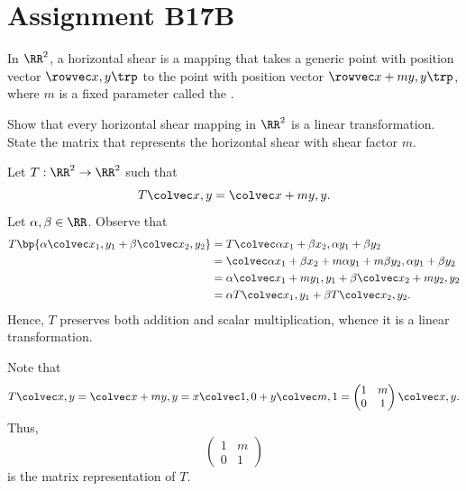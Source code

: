 \section{Assignment B17B}

\begin{problem}
    In $\RR^2$, a horizontal shear is a mapping that takes a generic point with position vector $\cveciix{x}{y}$ to the point with position vector $\cveciix{x + my}{y}$, where $m$ is a fixed parameter called the .

    Show that every horizontal shear mapping in $\RR^2$ is a linear transformation. State the matrix that represents the horizontal shear with shear factor $m$.
\end{problem}
\begin{solution}
    Let $T : \RR^2 \to \RR^2$ such that \[T\cvecii{x}{y} = \cvecii{x + my}{y}.\] Let $\a, \b \in \RR$. Observe that
    \begin{align*}
        T\bp{\a \cvecii{x_1}{y_1} + \b \cvecii{x_2}{y_2}} &= T\cvecii{\a x_1 + \b x_2}{\a y_1 + \b y_2}\\
        &= \cvecii{\a x_1 + \b x_2 + m \a y_1 + m \b y_2}{\a y_1 + \b y_2}\\
        &= \a \cvecii{x_1 + m y_1}{y_1} + \b \cvecii{x_2 + m y_2}{y_2}\\
        &= \a T\cvecii{x_1}{y_1} + \b T\cvecii{x_2}{y_2}.
    \end{align*}
    Hence, $T$ preserves both addition and scalar multiplication, whence it is a linear transformation.

    Note that \[T\cvecii{x}{y} = \cvecii{x + my}{y} = x \cvecii10 + y \cvecii{m}{1} = \begin{pmatrix}1 & m \\ 0 & 1\end{pmatrix} \cvecii{x}{y}.\] Thus, \[\begin{pmatrix}1 & m \\ 0 & 1\end{pmatrix}\] is the matrix representation of $T$.
\end{solution}

